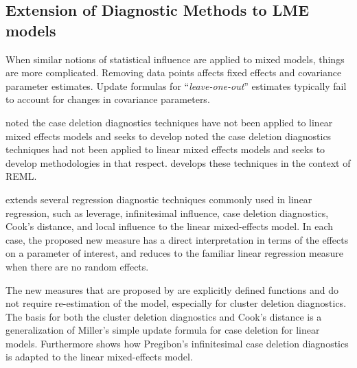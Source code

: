 \documentclass[12pt, a4paper]{article}
\begin{document}
			\subsection{Extension of Diagnostic Methods to LME models}
			
			
			When similar notions of statistical influence are applied to mixed models,
			things are more complicated. Removing data points affects fixed effects and covariance parameter estimates.
			Update formulas for “\textit{leave-one-out}” estimates typically fail to account for changes in covariance
			parameters. 
			
			\citet{Christiansen} noted the case deletion diagnostics techniques have not been applied to linear mixed effects models and seeks to develop 
			\citet{CPJ} noted the case deletion diagnostics techniques had not been applied to linear mixed effects models and seeks to develop methodologies in that respect. \citet{CPJ} develops these techniques in the context of REML.
			
			
			
			
			\citet{Demi} extends several regression diagnostic techniques commonly used in linear regression, such as leverage, infinitesimal influence, case deletion diagnostics, Cook's distance, and local influence to the linear mixed-effects model. In each case, the proposed new measure has a direct interpretation in terms of the effects on a parameter of interest, and reduces to the familiar linear regression measure when there are no random effects. 
			
			The new measures that are proposed by \citet{Demi} are explicitly defined functions and do not require re-estimation of the model, especially for cluster deletion diagnostics. The basis for both the cluster deletion diagnostics and Cook's distance is a generalization of Miller's simple update formula for case deletion for linear models. Furthermore \citet{Demi} shows how Pregibon's infinitesimal case deletion diagnostics is adapted to the linear mixed-effects model. 
			
\end{document}
